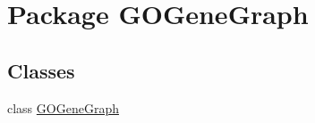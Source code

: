 \hypertarget{namespace_g_o_gene_graph}{
\section{Package GOGeneGraph}
\label{namespace_g_o_gene_graph}
}
\subsection*{Classes}
\begin{DoxyCompactItemize}
\item 
class \hyperlink{class_g_o_gene_graph_1_1_g_o_gene_graph}{GOGeneGraph}
\end{DoxyCompactItemize}
